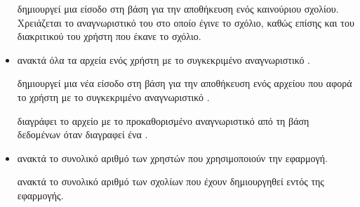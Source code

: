 \begin{itemize}
    \newline \newline
    \textbf{}
    \newline \newline \noindent
    δημιουργεί μια είσοδο στη βάση για την αποθήκευση ενός καινούριου σχολίου. Χρειάζεται το αναγνωριστικό του  στο οποίο έγινε το σχόλιο, καθώς επίσης και του διακριτικού του χρήστη που έκανε το σχόλιο.
    
    \item {}
    
    \newline \newline
    \textbf{}
    \newline \newline \noindent
    ανακτά όλα τα αρχεία ενός χρήστη με το συγκεκριμένο αναγνωριστικό .
    
    \newline \newline
    \textbf{}
    \newline \newline \noindent
    δημιουργεί μια νέα είσοδο στη βάση για την αποθήκευση ενός αρχείου που αφορά το χρήστη με το συγκεκριμένο αναγνωριστικό .
    
    \newline \newline
    \textbf{}
    \newline \newline \noindent
    διαγράφει το αρχείο με το προκαθορισμένο αναγνωριστικό  από τη βάση δεδομένων όταν διαγραφεί ένα .
    
    \item {}
    
    \newline \newline
    \textbf{}
    \newline \newline \noindent
    ανακτά το συνολικό αριθμό των χρηστών που χρησιμοποιούν την εφαρμογή.
    
    \newline \newline
    \textbf{}
    \newline \newline \noindent
    ανακτά το συνολικό αριθμό των σχολίων που έχουν δημιουργηθεί εντός της εφαρμογής.
    

\end{itemize}
